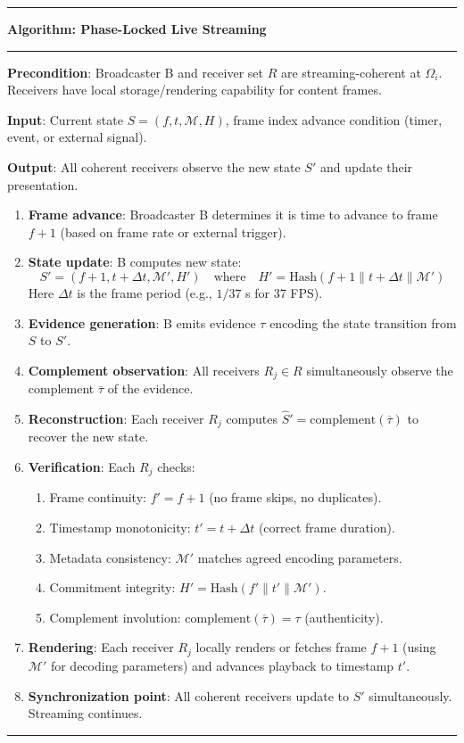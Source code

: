\documentclass[twocolumn,10pt,a4paper]{article}
\theoremstyle{plain}
\theoremstyle{definition}
\newenvironment{algo}[1]
  {\par\medskip\noindent\rule{\linewidth}{0.8pt}\par\nobreak\smallskip
   \noindent\textbf{Algorithm: #1}\par\nobreak\smallskip
   \noindent\rule{\linewidth}{0.4pt}\par\nobreak\smallskip}
  {\par\smallskip\noindent\rule{\linewidth}{0.8pt}\par\medskip}
\begin{document}
\begin{algo}{Phase-Locked Live Streaming}

\textbf{Precondition}: Broadcaster B and receiver set $R$ are streaming-coherent at $\Omega_i$. Receivers have local storage/rendering capability for content frames.

\textbf{Input}: Current state $S = (f, t, \mathcal{M}, H)$, frame index advance condition (timer, event, or external signal).

\textbf{Output}: All coherent receivers observe the new state $S'$ and update their presentation.

\begin{enumerate}
\item \textbf{Frame advance}: Broadcaster B determines it is time to advance to frame $f+1$ (based on frame rate or external trigger).
\item \textbf{State update}: B computes new state:
  \[
  S' = (f+1, t + \Delta t, \mathcal{M}', H')
  \quad \text{where} \quad H' = \mathrm{Hash}(f+1 \| t + \Delta t \| \mathcal{M}')
  \]
  Here $\Delta t$ is the frame period (e.g., $1/37$ s for 37 FPS).
\item \textbf{Evidence generation}: B emits evidence $\tau$ encoding the state transition from $S$ to $S'$.
\item \textbf{Complement observation}: All receivers $R_j \in R$ simultaneously observe the complement $\overline{\tau}$ of the evidence.
\item \textbf{Reconstruction}: Each receiver $R_j$ computes $\widehat{S}' = \mathrm{complement}(\overline{\tau})$ to recover the new state.
\item \textbf{Verification}: Each $R_j$ checks:
  \begin{enumerate}
  \item Frame continuity: $f' = f + 1$ (no frame skips, no duplicates).
  \item Timestamp monotonicity: $t' = t + \Delta t$ (correct frame duration).
  \item Metadata consistency: $\mathcal{M}'$ matches agreed encoding parameters.
  \item Commitment integrity: $H' = \mathrm{Hash}(f' \| t' \| \mathcal{M}')$.
  \item Complement involution: $\mathrm{complement}(\overline{\tau}) = \tau$ (authenticity).
  \end{enumerate}
\item \textbf{Rendering}: Each receiver $R_j$ locally renders or fetches frame $f+1$ (using $\mathcal{M}'$ for decoding parameters) and advances playback to timestamp $t'$.
\item \textbf{Synchronization point}: All coherent receivers update to $S'$ simultaneously. Streaming continues.
\end{enumerate}
\end{algo}
\end{document}
